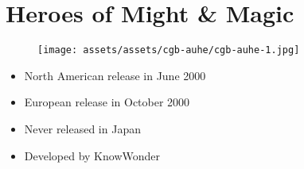 \documentclass{book}
\begin{document}
\begingroup \chapter*{Heroes of Might \& Magic} \endgroup
\begin{figure}[H]
\vskip 4pt
\centering
\texttt{[image: assets/assets/cgb-auhe/cgb-auhe-1.jpg]}\end{figure}
\begin{itemize} [nosep]




\item North American release in June 2000







\item European release in October 2000








\item Never released in Japan





\item Developed by KnowWonder

\end{itemize}\noindent
\end{document}
